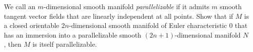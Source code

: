 We call an $m$-dimensional smooth manifold \textit{parallelizable} if it admits $m$ smooth tangent vector fields that are linearly independent at all points. Show that if $M$ is a closed orientable $2n$-dimensional smooth manifold of Euler characteristic $0$ that has an immersion into a parallelizable smooth $(2n+1)$-dimensional manifold $N$, then $M$ is itself parallelizable.